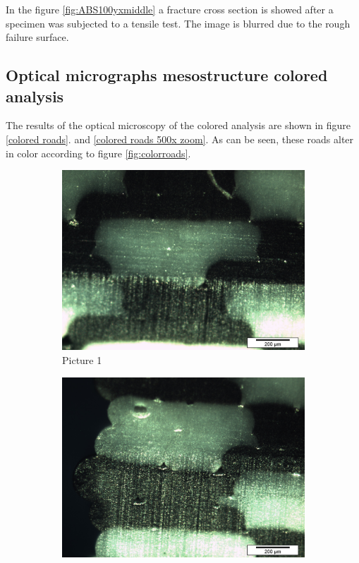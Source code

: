 In the figure \ref{fig:ABS100yxmiddle} a fracture cross section is showed after a specimen was subjected to a tensile test. The image is blurred due to the rough failure surface.

\subsection{Optical micrographs mesostructure colored analysis}

The results of the optical microscopy of the colored analysis are shown in figure \ref{colored roads}. and \ref{colored roads 500x zoom}. As can be seen, these roads alter in color according to figure \ref{fig:colorroads}. 
\begin{figure}
\centering
  \begin{subfigure}[b]{0.48\textwidth}
    \includegraphics[width=\textwidth]{chapter_4_RVE_Definition/figures/colored/Tv35_LI.jpg}
    \caption{Picture 1}
    \label{fig:1}
  \end{subfigure}
  \begin{subfigure}[b]{0.48\textwidth}
    \includegraphics[width=\textwidth]{chapter_4_RVE_Definition/figures/colored/Tv38_LI.jpg}

\end{subfigure}
\end{figure}
